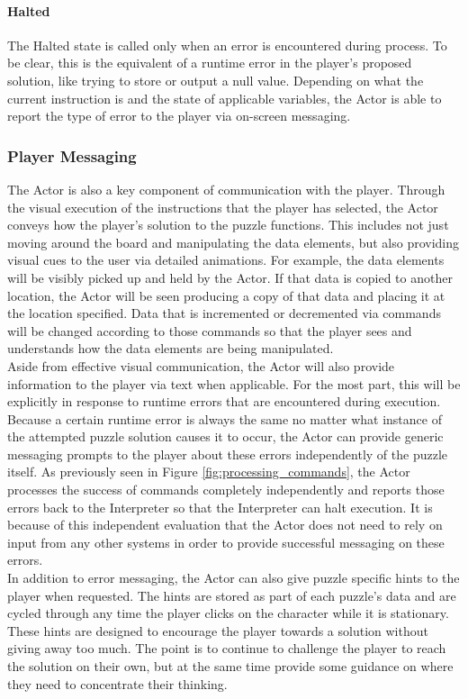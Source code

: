 \paragraph{Halted}
The Halted state is called only when an error is encountered during process. To be clear, this is the equivalent of a runtime error in the player's proposed solution, like trying to store or output a null value. Depending on what the current instruction is and the state of applicable variables, the Actor is able to report the type of error to the player via on-screen messaging.

\subsubsection{Player Messaging}
The Actor is also a key component of communication with the player. Through the visual execution of the instructions that the player has selected, the Actor conveys how the player's solution to the puzzle functions. This includes not just moving around the board and manipulating the data elements, but also providing visual cues to the user via detailed animations. For example, the data elements will be visibly picked up and held by the Actor. If that data is copied to another location, the Actor will be seen producing a copy of that data and placing it at the location specified. Data that is incremented or decremented via commands will be changed according to those commands so that the player sees and understands how the data elements are being manipulated.\\

Aside from effective visual communication, the Actor will also provide information to the player via text when applicable. For the most part, this will be explicitly in response to runtime errors that are encountered during execution. Because a certain runtime error is always the same no matter what instance of the attempted puzzle solution causes it to occur, the Actor can provide generic messaging prompts to the player about these errors independently of the puzzle itself. As previously seen in Figure \ref{fig:processing_commands}, the Actor processes the success of commands completely independently and reports those errors back to the Interpreter so that the Interpreter can halt execution. It is because of this independent evaluation that the Actor does not need to rely on input from any other systems in order to provide successful messaging on these errors.\\

In addition to error messaging, the Actor can also give puzzle specific hints to the player when requested. The hints are stored as part of each puzzle's data and are cycled through any time the player clicks on the character while it is stationary. These hints are designed to encourage the player towards a solution without giving away too much. The point is to continue to challenge the player to reach the solution on their own, but at the same time provide some guidance on where they need to concentrate their thinking.


\vfill
\clearpage